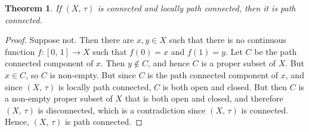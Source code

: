 \documentclass{article}
\theoremstyle{plain}
\newtheorem{theorem}{Theorem}[section]
\theoremstyle{normal}
\begin{document}
        \begin{theorem}
            If $(X,\,\tau)$ is connected and locally path connected, then it is
            path connected.
        \end{theorem}
        \begin{proof}
            Suppose not. Then there are $x,y\in{X}$ such that there is no
            continuous function $f:[0,\,1]\rightarrow{X}$ such that
            $f(0)=x$ and $f(1)=y$. Let $C$ be the path connected component of
            $x$. Then $y\notin{C}$, and hence $C$ is a proper subset of $X$.
            But $x\in{C}$, so $C$ is non-empty. But since $C$ is the path
            connected component of $x$, and since $(X,\,\tau)$ is locally path
            connected, $C$ is both open and closed. But then $C$ is a non-empty
            proper subset of $X$ that is both open and closed, and therefore
            $(X,\,\tau)$ is disconnected, which is a contradiction since
            $(X,\,\tau)$ is connected. Hence, $(X,\,\tau)$ is path connected.
        \end{proof}
\end{document}
